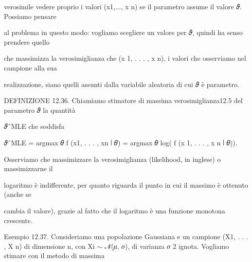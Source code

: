 \documentclass[a4paper,portrait,12pt]{article}
\begin{document}
\begin{flushleft}
verosimile vedere proprio i valori (x1,..., x n) se il parametro assume il valore 𝜗. Possiamo pensare
\end{flushleft}


\begin{flushleft}
al problema in questo modo: vogliamo scegliere un valore per 𝜗, quindi ha senso prendere quello
\end{flushleft}


\begin{flushleft}
che massimizza la verosimiglianza che (x 1, . . . , x n), i valori che osserviamo nel campione alla sua
\end{flushleft}


\begin{flushleft}
realizzazione, siano quelli assunti dalla variabile aleatoria di cui 𝜗 \`{e} parametro.
\end{flushleft}


\begin{flushleft}
DEFINIZIONE 12.36. Chiamiamo stimatore di massima verosimiglianza12.5 del parametro 𝜗 la quantit\`{a}
\end{flushleft}


\begin{flushleft}
𝜗ˆMLE che soddisfa
\end{flushleft}


\begin{flushleft}
𝜗ˆMLE = argmax 𝜃 f (x1, . . . , xn ∣ 𝜃) = argmax 𝜃 log( f (x 1, . . . , x n ∣ 𝜃)).
\end{flushleft}


\begin{flushleft}
Osserviamo che massimizzare la verosimiglianza (likelihood, in inglese) o massimizzarne il
\end{flushleft}


\begin{flushleft}
logaritmo \`{e} indifferente, per quanto riguarda il punto in cui il massimo \`{e} ottenuto (anche se
\end{flushleft}


\begin{flushleft}
cambia il valore), grazie al fatto che il logaritmo \`{e} una funzione monotona crescente.
\end{flushleft}


\begin{flushleft}
Esempio 12.37. Consideriamo una popolazione Gaussiana e un campione (X1, . . . , X n) di dimensione n, con Xi $\sim$ 𝒩(𝜇, 𝜎), di varianza 𝜎 2 ignota. Vogliamo stimare con il metodo di massima
\end{flushleft}
\end{document}

